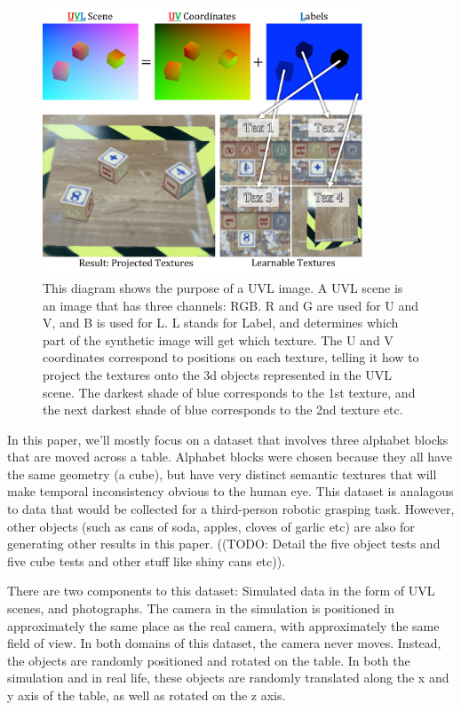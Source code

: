 \documentclass{article}
\begin{document}
\begin{figure}[H]
	\begin{center}
		\includegraphics[width=270pt]{uvl_explanation.pdf}
	\end{center}
	\caption{
		This diagram shows the purpose of a UVL image.
		 A UVL scene is an image that has three channels: RGB.
		 R and G are used for U and V, and B is used for L.
		 L stands for Label, and determines which part of the synthetic image will get which texture.
		 The U and V coordinates correspond to positions on each texture,
		 	telling it how to project the textures onto the 3d objects represented in the UVL scene.
		The darkest shade of blue corresponds to the 1st texture, and the next darkest shade of blue corresponds to the 2nd texture etc.
		}
	\label{fig:uvl_explanation}
\end{figure}

In this paper, we'll mostly focus on a dataset that involves three alphabet blocks that are moved across a table.
Alphabet blocks were chosen because they all have the same geometry (a cube), but have very distinct semantic textures that will make temporal inconsistency obvious to the human eye.
This dataset is analagous to data that would be collected for a third-person robotic grasping task.
However, other objects (such as cans of soda, apples, cloves of garlic etc) are also for generating other results in this paper. ((TODO: Detail the five object tests and five cube tests and other stuff like shiny cans etc)).

There are two components to this dataset: Simulated data in the form of UVL scenes, and photographs.
The camera in the simulation is positioned in approximately the same place as the real camera, with approximately the same field of view.
In both domains of this dataset, the camera never moves. Instead, the objects are randomly positioned and rotated on the table.
In both the simulation and in real life, these objects are randomly translated along the x and y axis of the table, as well as rotated on the z axis.
\end{document}
